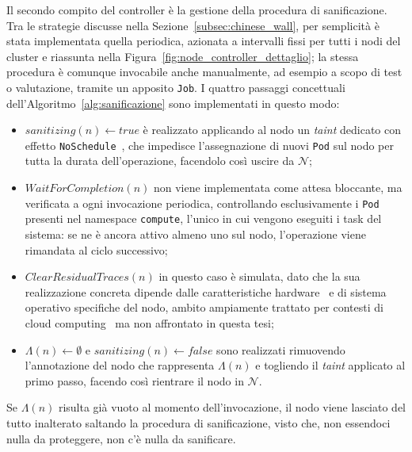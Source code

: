 Il secondo compito del controller è la gestione della procedura di sanificazione. Tra le strategie discusse nella Sezione~\ref{subsec:chinese_wall}, per semplicità è stata implementata quella periodica, azionata a intervalli fissi per tutti i nodi del cluster e riassunta nella Figura~\ref{fig:node_controller_dettaglio}; la stessa procedura è comunque invocabile anche manualmente, ad esempio a scopo di test o valutazione, tramite un apposito \texttt{Job}. I quattro passaggi concettuali dell'Algoritmo~\ref{alg:sanificazione} sono implementati in questo modo:

\begin{itemize}
    \item $sanitizing(n) \leftarrow \mathit{true}$ è realizzato applicando al nodo un \emph{taint} dedicato con effetto \texttt{NoSchedule}~\cite{k8s-taint-toleration}, che impedisce l'assegnazione di nuovi \texttt{Pod} sul nodo per tutta la durata dell'operazione, facendolo così uscire da $\mathcal{N}$;
    \item $\mathit{WaitForCompletion}(n)$ non viene implementata come attesa bloccante, ma verificata a ogni invocazione periodica, controllando esclusivamente i \texttt{Pod} presenti nel namespace \texttt{compute}, l'unico in cui vengono eseguiti i task del sistema: se ne è ancora attivo almeno uno sul nodo, l'operazione viene rimandata al ciclo successivo;
    \item $\mathit{ClearResidualTraces}(n)$ in questo caso è simulata, dato che la sua realizzazione concreta dipende dalle caratteristiche hardware~\cite{data-remanence-flash-memory} e di sistema operativo specifiche del nodo, ambito ampiamente trattato per contesti di cloud computing~\cite{survey-data-remanence-cloud, standards-techniques-remove-data-remanence-cloud} ma non affrontato in questa tesi;
    \item $\Lambda(n) \leftarrow \emptyset$ e $sanitizing(n) \leftarrow \mathit{false}$ sono realizzati rimuovendo l'annotazione del nodo che rappresenta $\Lambda(n)$ e togliendo il \emph{taint} applicato al primo passo, facendo così rientrare il nodo in $\mathcal{N}$.
\end{itemize}

Se $\Lambda(n)$ risulta già vuoto al momento dell'invocazione, il nodo viene lasciato del tutto inalterato saltando la procedura di sanificazione, visto che, non essendoci nulla da proteggere, non c'è nulla da sanificare.


